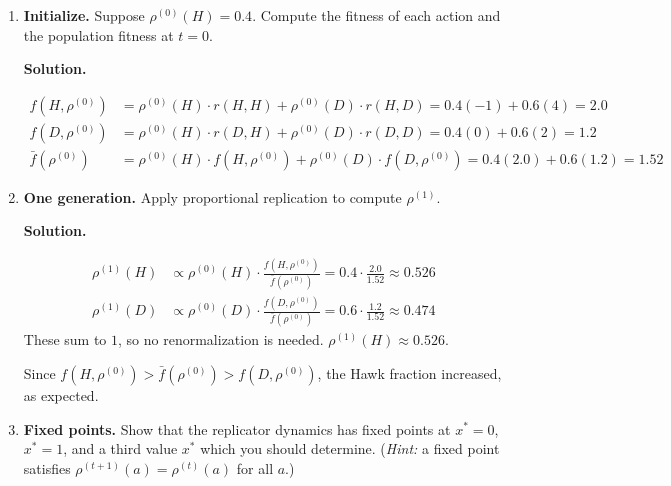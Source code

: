 \documentclass[12pt]{article}
\newenvironment{solution}{%
  \ifshowsolutions\begin{solutionbox}\noindent\textbf{\color{blue!70!black}Solution.}\quad\fi
  \ifshowsolutions\else\expandafter\comment\fi
}{%
  \ifshowsolutions\end{solutionbox}\fi
  \ifshowsolutions\else\expandafter\endcomment\fi
}
\begin{document}
\begin{enumerate}
  \item \textbf{Initialize.} Suppose $\rho^{(0)}(H) = 0.4$. Compute the fitness of each action and the population fitness at $t=0$.

  \begin{solution}
    \begin{align*}
      f\!\left(H,\rho^{(0)}\right) &= \rho^{(0)}(H)\cdot r(H,H) + \rho^{(0)}(D)\cdot r(H,D)
                                    = 0.4(-1) + 0.6(4) = 2.0\\
      f\!\left(D,\rho^{(0)}\right) &= \rho^{(0)}(H)\cdot r(D,H) + \rho^{(0)}(D)\cdot r(D,D)
                                    = 0.4(0) + 0.6(2) = 1.2\\
      \bar{f}\!\left(\rho^{(0)}\right) &= \rho^{(0)}(H)\cdot f(H,\rho^{(0)}) + \rho^{(0)}(D)\cdot f(D,\rho^{(0)})
                                        = 0.4(2.0) + 0.6(1.2) = 1.52
    \end{align*}
  \end{solution}

  \item \textbf{One generation.} Apply proportional replication to compute $\rho^{(1)}$.

  \begin{solution}
    \begin{align*}
      \rho^{(1)}(H) &\propto \rho^{(0)}(H)\cdot\frac{f(H,\rho^{(0)})}{\bar{f}(\rho^{(0)})}
                     = 0.4\cdot\frac{2.0}{1.52} \approx 0.526\\
      \rho^{(1)}(D) &\propto \rho^{(0)}(D)\cdot\frac{f(D,\rho^{(0)})}{\bar{f}(\rho^{(0)})}
                     = 0.6\cdot\frac{1.2}{1.52} \approx 0.474
    \end{align*}
    These sum to $1$, so no renormalization is needed. $\rho^{(1)}(H) \approx 0.526$.

    Since $f(H,\rho^{(0)}) > \bar{f}(\rho^{(0)}) > f(D,\rho^{(0)})$, the Hawk fraction increased, as expected.
  \end{solution}

  \item \textbf{Fixed points.} Show that the replicator dynamics has fixed points at $x^* = 0$, $x^* = 1$, and a third value $x^*$ which you should determine. (\textit{Hint:} a fixed point satisfies $\rho^{(t+1)}(a) = \rho^{(t)}(a)$ for all $a$.)


\end{enumerate}
\end{document}
